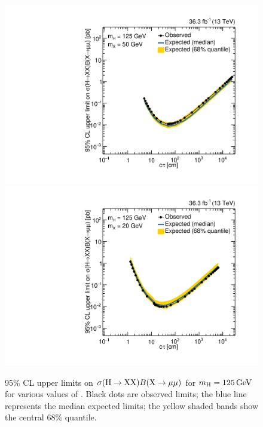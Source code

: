 \begin{figure}[htbp]
  \centering
  \includegraphics[width=\DSquareWidth]{figures/displaced/Limits_2Mu_125_50_HybridNew.pdf}
  \hspace*{-2em}
  \includegraphics[width=\DSquareWidth]{figures/displaced/Limits_2Mu_125_20_HybridNew.pdf}
  \caption[95\% CL upper limits on $\sigma(\PHiggs\to \PLLP\PLLP)B(\PLLP\to\Pgm\Pgm)$ for $\mH = 125\GeV$ for various values of \mX.]{95\% CL upper limits on $\sigma(\PHiggs\to \PLLP\PLLP)B(\PLLP\to\Pgm\Pgm)$ for $\mH = 125\GeV$ for various values of \mX. Black dots are observed limits; the blue line represents the median expected limits; the yellow shaded bands show the central 68\% quantile.}
  \label{fig:dd:UpperLimits_mH_125}
\end{figure}

